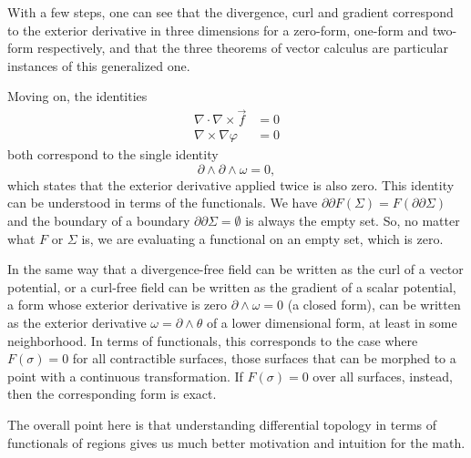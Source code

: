 \documentclass[fleqn,10pt]{wlscirep}
\begin{document}
With a few steps, one can see that the divergence, curl and gradient correspond to the exterior derivative in three dimensions for a zero-form, one-form and two-form respectively, and that the three theorems of vector calculus are particular instances of this generalized one.

Moving on, the identities
\begin{equation*}
	\begin{aligned}
		\nabla \cdot \nabla \times \vec{f} &= 0 \\
		\nabla \times \nabla \varphi &= 0
	\end{aligned}
\end{equation*}
both correspond to the single identity
\begin{equation*}
	\partial \wedge \partial \wedge \omega = 0,
\end{equation*}
which states that the exterior derivative applied twice is also zero. This identity can be understood in terms of the functionals. We have  $\partial \partial F(\Sigma) = F(\partial \partial \Sigma)$ and the boundary of a boundary $\partial \partial \Sigma = \emptyset$ is always the empty set. So, no matter what $F$ or $\Sigma$ is, we are evaluating a functional on an empty set, which is zero.

In the same way that a divergence-free field can be written as the curl of a vector potential, or a curl-free field can be written as the gradient of a scalar potential, a form whose exterior derivative is zero $\partial \wedge \omega = 0$ (a closed form), can be written as the exterior derivative $\omega = \partial \wedge \theta$ of a lower dimensional form, at least in some neighborhood. In terms of functionals, this corresponds to the case where $F(\sigma)=0$ for all contractible surfaces, those surfaces that can be morphed to a point with a continuous transformation. If $F(\sigma)=0$ over all surfaces, instead, then the corresponding form is exact. 

The overall point here is that understanding differential topology in terms of functionals of regions gives us much better motivation and intuition for the math.

\iffalse



\end{document}
